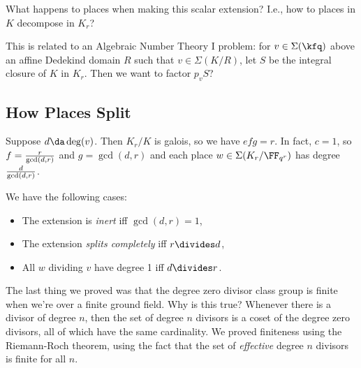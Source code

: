 \begin{question}

What happens to places when making this scalar extension? I.e., how to
places in \(K\) decompose in \(K_r\)?

\end{question}

\begin{remark}

This is related to an Algebraic Number Theory I problem: for
\(v\in \Sigma(\kfq)\) above an affine Dedekind domain \(R\) such that
\(v\in \Sigma(K/R)\), let \(S\) be the integral closure of \(K\) in
\(K_r\). Then we want to factor \(p_v S\)?

\end{remark}

\hypertarget{how-places-split}{%
\subsection{How Places Split}\label{how-places-split}}

\begin{lemma}

Suppose \(d\da \deg(v)\). Then \(K_r/K\) is galois, so we have
\(efg=r\). In fact, \(c=1\), so \(f = {r\over \gcd(d, r)}\) and
\(g = \gcd(d, r)\) and each place \(w\in \Sigma(K_r / \FF_{q^r})\) has
degree \({d\over \gcd(d, r)}\).

\end{lemma}

\begin{remark}

We have the following cases:

\begin{itemize}
\item
  The extension is \emph{inert} iff \(\gcd(d, r) = 1\),
\item
  The extension \emph{splits completely} iff \(r\divides d\),
\item
  All \(w\) dividing \(v\) have degree 1 iff \(d\divides r\).
\end{itemize}

\end{remark}

The last thing we proved was that the degree zero divisor class group is
finite when we're over a finite ground field. Why is this true? Whenever
there is a divisor of degree \(n\), then the set of degree \(n\)
divisors is a coset of the degree zero divisors, all of which have the
same cardinality. We proved finiteness using the Riemann-Roch theorem,
using the fact that the set of \emph{effective} degree \(n\) divisors is
finite for all \(n\).

